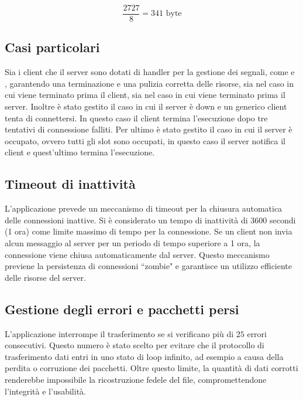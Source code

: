 \begin{equation}
    \frac{2727}{8} = 341 \text{ byte} \nonumber
\end{equation}

\subsection{Casi particolari }
Sia i client che il server sono dotati di handler per la gestione dei segnali, come  e , garantendo una terminazione e una pulizia corretta delle risorse, sia nel caso in cui viene terminato prima il client, sia nel caso in cui viene terminato prima il server.
Inoltre è stato gestito il caso in cui il server è down e un generico client tenta di connettersi.
In questo caso il client termina l'esecuzione dopo tre tentativi di connessione falliti.
Per ultimo è stato gestito il caso in cui il server è occupato, ovvero tutti gli slot sono occupati, in questo caso il server notifica il client e quest'ultimo termina l'esecuzione.

\subsection{Timeout di inattività }
L'applicazione prevede un meccanismo di timeout per la chiusura automatica delle connessioni inattive.
Si è considerato un tempo di inattività di 3600 secondi (1 ora) come limite massimo di tempo per la connessione.
Se un client non invia alcun messaggio al server per un periodo di tempo superiore a 1 ora, la connessione viene chiusa automaticamente dal server.
Questo meccanismo previene la persistenza di connessioni ``zombie" e garantisce un utilizzo efficiente delle risorse del server.

\subsection{Gestione degli errori e pacchetti persi }
L'applicazione interrompe il trasferimento se si verificano più di $25$ errori consecutivi.
Questo numero è stato scelto per evitare che il protocollo di trasferimento dati entri in uno stato di loop infinito, ad esempio a causa della perdita o corruzione dei pacchetti.
Oltre questo limite, la quantità di dati corrotti renderebbe impossibile la ricostruzione fedele del file, compromettendone l'integrità e l'usabilità.


